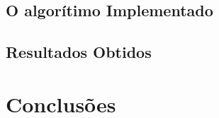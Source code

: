 \documentclass{article}
\begin{document}
\subsection{O algorítimo Implementado}
\subsection{Resultados Obtidos}

\section{Conclusões}
\end{document}
